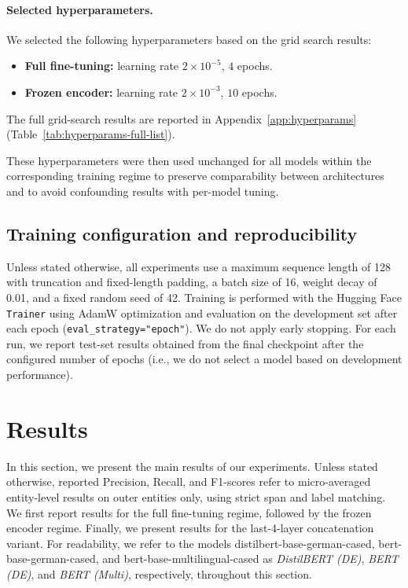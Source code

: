 \documentclass[11pt,a4paper,twocolumn]{article}
\begin{document}
\paragraph{Selected hyperparameters.}
We selected the following hyperparameters based on the grid search results:
\begin{itemize}
    \item \textbf{Full fine-tuning:} learning rate $2\times 10^{-5}$, $4$ epochs.
    \item \textbf{Frozen encoder:} learning rate $2\times 10^{-3}$, $10$ epochs.
\end{itemize}
The full grid-search results are reported in Appendix~\ref{app:hyperparams} (Table~\ref{tab:hyperparams-full-list}).

These hyperparameters were then used unchanged for all models within the corresponding training regime to preserve comparability between architectures and to avoid confounding results with per-model tuning.

\subsection{Training configuration and reproducibility}
Unless stated otherwise, all experiments use a maximum sequence length of 128 with truncation and fixed-length padding, a batch size of 16, weight decay of 0.01, and a fixed random seed of 42.
Training is performed with the Hugging Face \texttt{Trainer} using AdamW optimization and evaluation on the development set after each epoch (\texttt{eval\_strategy="epoch"}).
We do not apply early stopping.
For each run, we report test-set results obtained from the final checkpoint after the configured number of epochs (i.e., we do not select a model based on development performance).



\section{Results}
In this section, we present the main results of our experiments. Unless stated otherwise, reported Precision, Recall, and F1-scores refer to micro-averaged entity-level results on outer entities only, using strict span and label matching.
We first report results for the full fine-tuning regime, followed by the frozen encoder regime.
Finally, we present results for the last-4-layer concatenation variant.
For readability, we refer to the models distilbert-base-german-cased,
bert-base-german-cased, and bert-base-multilingual-cased
as \emph{DistilBERT (DE)}, \emph{BERT (DE)}, and \emph{BERT (Multi)}, respectively, throughout this section.
\end{document}
